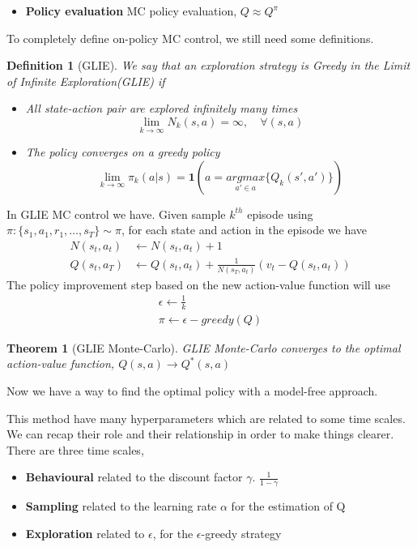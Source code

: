 \documentclass[main.tex]{subfiles}
\newtheorem{theorem}{Theorem}[section]
\newtheorem{definition}{Definition}[section]
\begin{document}
\begin{itemize}
    \item \textbf{Policy evaluation} MC policy evaluation, $Q \approx Q^{\pi}$
\end{itemize}
To completely define on-policy MC control, we still need some definitions.
\begin{definition}[GLIE]
We say that an exploration strategy is Greedy in the Limit of Infinite Exploration(GLIE) if
\begin{itemize}
    \item All state-action pair are explored infinitely many times
    \begin{equation*}
        \lim_{k \rightarrow \infty} N_k(s,a) = \infty, \quad \forall(s,a)
    \end{equation*}
    \item The policy converges on a greedy policy
    \begin{equation*}
        \lim_{k \rightarrow \infty} \pi_k(a|s) = \mathbf{1}(a = \underset{a' \in a}{argmax}\{ Q_k(s',a') \})
    \end{equation*}
\end{itemize}
\end{definition}
\par\noindent
In GLIE MC control we have. Given sample $k^{th}$ episode using $\pi:\{ s_1,a_1,r_1,\dots,s_T \} \sim \pi$, for each state and action in the episode we have
\begin{align*}
    N(s_t,a_t) &\leftarrow N(s_t,a_t) + 1 \\
    Q(s_t, a_T) &\leftarrow Q(s_t,a_t) + \frac{1}{N(s_T,a_t)}(v_t - Q(s_t,a_t))
\end{align*}
The policy improvement step based on the new action-value function will use
\begin{gather*}
    \epsilon \leftarrow \frac{1}{k} \\
    \pi \leftarrow \epsilon-greedy(Q)
\end{gather*}
\begin{theorem}[GLIE Monte-Carlo]
GLIE Monte-Carlo converges to the optimal action-value function, $Q(s,a) \rightarrow Q^*(s,a)$
\end{theorem}
Now we have a way to find the optimal policy with a model-free approach.
\par\noindent
This method have many hyperparameters which are related to some time scales. We can recap their role and their relationship in order to make things clearer. There are three time scales,
\begin{itemize}
    \item \textbf{Behavioural} related to the discount factor $\gamma$. $\frac{1}{1-\gamma}$
    \item \textbf{Sampling} related to the learning rate $\alpha$ for the estimation of Q
    \item \textbf{Exploration} related to $\epsilon$, for the $\epsilon$-greedy strategy
\end{itemize}
\end{document}
